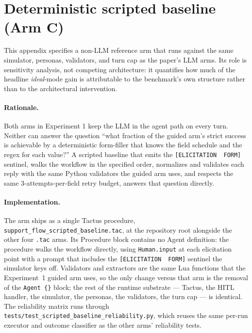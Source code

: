 \documentclass[11pt,a4paper]{article}
\begin{document}
\section{Deterministic scripted baseline (Arm C)}
\label{app:scripted}

This appendix specifies a non-LLM reference arm that runs against the same simulator, personas, validators, and turn cap as the paper's LLM arms. Its role is sensitivity analysis, not competing architecture: it quantifies how much of the headline \emph{ideal}-mode gain is attributable to the benchmark's own structure rather than to the architectural intervention.

\paragraph{Rationale.}
Both arms in Experiment 1 keep the LLM in the agent path on every turn. Neither can answer the question ``what fraction of the guided arm's strict success is achievable by a deterministic form-filler that knows the field schedule and the regex for each value?'' A scripted baseline that emits the \texttt{[ELICITATION \textperiodcentered\ FORM]} sentinel, walks the workflow in the specified order, normalizes and validates each reply with the same Python validators the guided arm uses, and respects the same 3-attempts-per-field retry budget, answers that question directly.

\paragraph{Implementation.}
The arm ships as a single Tactus procedure, \texttt{support\_flow\_scripted\_baseline.tac}, at the repository root alongside the other four \texttt{.tac} arms. Its Procedure block contains no Agent definition: the procedure walks the workflow directly, using \texttt{Human.input} at each elicitation point with a prompt that includes the \texttt{[ELICITATION \textperiodcentered\ FORM]} sentinel the simulator keys off. Validators and extractors are the same Lua functions that the Experiment~1 guided arm uses, so the only change versus that arm is the removal of the \texttt{Agent \{\}} block; the rest of the runtime substrate --- Tactus, the HITL handler, the simulator, the personas, the validators, the turn cap --- is identical. The reliability matrix runs through \texttt{tests/test\_scripted\_baseline\_reliability.py}, which reuses the same per-run executor and outcome classifier as the other arms' reliability tests.
\end{document}
